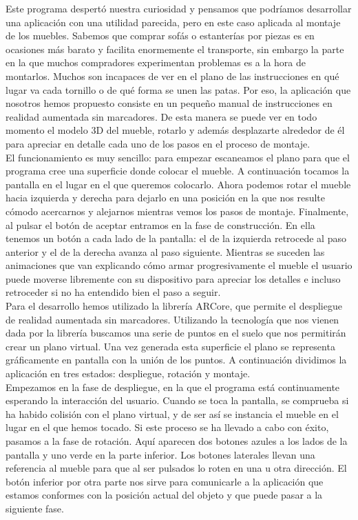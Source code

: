 Este programa despertó nuestra curiosidad y pensamos que podríamos desarrollar una aplicación con una utilidad parecida, pero en este caso aplicada al montaje de los muebles. Sabemos que comprar sofás o estanterías por piezas es en ocasiones más barato y facilita enormemente el transporte, sin embargo la parte en la que muchos compradores experimentan problemas es a la hora de montarlos. Muchos son incapaces de ver en el plano de las instrucciones en qué lugar va cada tornillo o de qué forma se unen las patas. Por eso, la aplicación que nosotros hemos propuesto consiste en un pequeño manual de instrucciones en realidad aumentada sin marcadores. De esta manera se puede ver en todo momento el modelo 3D del mueble, rotarlo y además desplazarte alrededor de él para apreciar en detalle cada uno de los pasos en el proceso de montaje.\\

El funcionamiento es muy sencillo: para empezar escaneamos el plano para que el programa cree una superficie donde colocar el mueble. A continuación tocamos la pantalla en el lugar en el que queremos colocarlo. Ahora podemos rotar el mueble hacia izquierda y derecha para dejarlo en una posición en la que nos resulte cómodo acercarnos y alejarnos mientras vemos los pasos de montaje. Finalmente, al pulsar el botón de aceptar entramos en la fase de construcción. En ella tenemos un botón a cada lado de la pantalla: el de la izquierda retrocede al paso anterior y el de la derecha avanza al paso siguiente. Mientras se suceden las animaciones que van explicando cómo armar progresivamente el mueble el usuario puede moverse libremente con su dispositivo para apreciar los detalles e incluso retroceder si no ha entendido bien el paso a seguir.\\

Para el desarrollo hemos utilizado la librería ARCore, que permite el despliegue de realidad aumentada sin marcadores. Utilizando la tecnología que nos vienen dada por la librería buscamos una serie de puntos en el suelo que nos permitirán crear un plano virtual. Una vez generada esta superficie el plano se representa gráficamente en pantalla con la unión de los puntos. A continuación dividimos la aplicación en tres estados: despliegue, rotación y montaje.\\ 

Empezamos en la fase de despliegue, en la que el programa está continuamente esperando la interacción del usuario. Cuando se toca la pantalla, se comprueba si ha habido colisión con el plano virtual, y de ser así se instancia el mueble en el lugar en el que hemos tocado. Si este proceso se ha llevado a cabo con éxito, pasamos a la fase de rotación. Aquí aparecen dos botones azules a los lados de la pantalla y uno verde en la parte inferior. Los botones laterales llevan una referencia al mueble para que al ser pulsados lo roten en una u otra dirección. El botón inferior por otra parte nos sirve para comunicarle a la aplicación que estamos conformes con la posición actual del objeto y que puede pasar a la siguiente fase.\\ 

